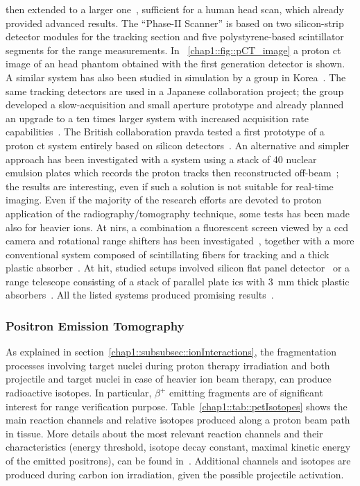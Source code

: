 then extended to a larger one~\parencite{Johnson2016}, sufficient for a human head scan, which already provided advanced results. The \enquote{Phase-II Scanner} is based on two silicon-strip detector modules for the tracking section and five polystyrene-based scintillator segments for the range measurements. In \figurename~\ref{chap1::fig::pCT_image} a proton \gls{ct} image of an head phantom obtained with the first generation detector is shown. A similar system has also been studied in simulation by a group in Korea~\parencite{Lee2016}. The same tracking detectors are used in a Japanese collaboration project; the group developed a slow-acquisition and small aperture prototype and already planned an upgrade to a ten times larger system with increased acquisition rate capabilities~\parencite{Saraya2014}. The British collaboration \gls{pravda} tested a first prototype of a proton \gls{ct} system entirely based on silicon detectors~\parencite{Taylor2014, Taylor2016}. An alternative and simpler approach has been investigated with a system using a stack of 40 nuclear emulsion plates which records the proton tracks then reconstructed off-beam~\parencite{Braccini2010b}; the results are interesting, even if such a solution is not suitable for real-time imaging.   
Even if the majority of the research efforts are devoted to proton application of the radiography/tomography technique, some tests has been made also for heavier ions. At \gls{nirs}, a combination a fluorescent screen viewed by a \gls{ccd} camera and rotational range shifters has been investigated~\parencite{Abe2002}, together with a more conventional system composed of scintillating fibers for tracking and a thick plastic absorber~\parencite{Shinoda2006}. At \gls{hit}, studied setups involved silicon flat panel detector~\parencite{Telsemeyer2012} or a range telescope consisting of a stack of parallel plate \glspl{ic} with 3~mm thick plastic absorbers~\parencite{Rinaldi2013}. All the listed systems produced promising results~\parencite{Parodi2014}.
    
\subsubsection{Positron Emission Tomography}\label{chap1::subsubsec::RangePET}
As explained in section~\ref{chap1::subsubsec::ionInteractions}, the fragmentation processes involving target nuclei during proton therapy irradiation and both projectile and target nuclei in case of heavier ion beam therapy, can produce radioactive isotopes. In particular, $\beta^+$ emitting fragments are of significant interest for range verification purpose. Table~\ref{chap1::tab::petIsotopes} shows the main reaction channels and relative isotopes produced along a proton beam path in tissue. More details about the most relevant reaction channels and their characteristics (energy threshold, isotope decay constant, maximal kinetic energy of the emitted positrons), can be found in~\cite{Oelfke1996}. Additional channels and isotopes are produced during carbon ion irradiation, given the possible projectile activation. 

